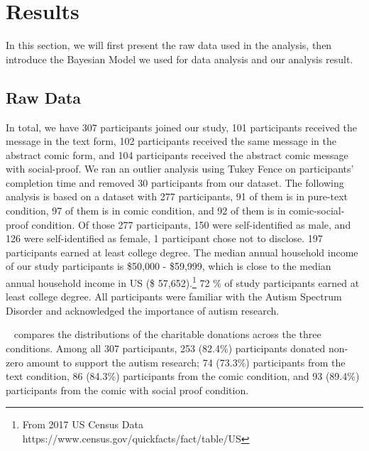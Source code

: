 \section{Results}
\label{sec:Study on Behavior Results}

In this section, we will first present the raw data used in the analysis, then introduce the Bayesian Model we used for data analysis and our analysis result.

\subsection{Raw Data}
\label{sub:Study on Behavior Raw Data}
In total, we have 307 participants joined our study, 101 participants received the message in the text form, 102 participants received the same message in the abstract comic form, and 104 participants received the abstract comic message with social-proof. We ran an outlier analysis using Tukey Fence on participants' completion time and removed 30 participants from our dataset. The following analysis is based on a dataset with 277 participants, 91 of them is in pure-text condition, 97 of them is in comic condition, and 92 of them is in comic-social-proof condition. Of those 277 participants, 150 were self-identified as male, and 126 were self-identified as female, 1 participant chose not to disclose. 197 participants earned at least college degree. The median annual household income of our study participants is \$50,000 - \$59,999, which is close to the median annual household income in US (\$ 57,652).\footnote{From 2017 US Census Data https://www.census.gov/quickfacts/fact/table/US} 72 \% of study participants earned at least college degree. All participants were familiar with the Autism Spectrum Disorder and acknowledged the importance of autism research. 

~ compares the distributions of the charitable donations across the three conditions. Among all 307 participants, 253 (82.4\%) participants donated non-zero amount to support the autism research; 74 (73.3\%) participants from the text condition, 86 (84.3\%) participants from the comic condition, and 93 (89.4\%) participants from the comic with social proof condition.



